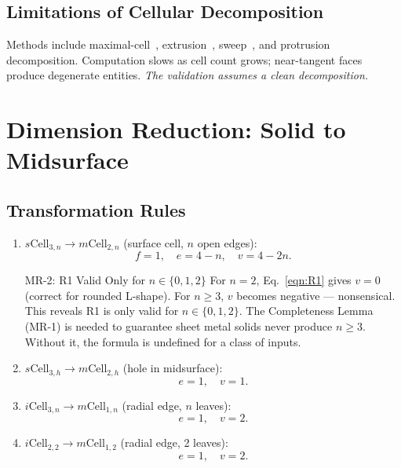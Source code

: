\documentclass[journal,twocolumn,10pt]{IEEEtran}
\newcommand{\sCell}[2]{s\text{Cell}_{#1,#2}}
\newcommand{\iCell}[2]{i\text{Cell}_{#1,#2}}
\newcommand{\mCell}[2]{m\text{Cell}_{#1,#2}}
\begin{document}
\subsection{Limitations of Cellular Decomposition}

Methods include maximal-cell~\cite{Woo2003}, extrusion~\cite{Boussuge2013a},
sweep~\cite{Wu2014}, and protrusion~\cite{Woo2014} decomposition. Computation
slows as cell count grows; near-tangent faces produce degenerate entities.
\emph{The validation assumes a clean decomposition.}

\section{Dimension Reduction: Solid to Midsurface}\label{sec:solidtomid}

\subsection{Transformation Rules}\label{sec:reduction_rules}

\begin{enumerate}[label=\textbf{R\arabic*.},noitemsep,topsep=2pt]

\item $\sCell{3}{n}\to\mCell{2}{n}$ (surface cell, $n$ open edges):
      \begin{equation}
        f=1,\quad e=4-n,\quad v=4-2n. \label{eqn:R1}
      \end{equation}

\begin{mrblock}{MR-2: R1 Valid Only for $n\in\{0,1,2\}$}
For $n=2$, Eq.~\eqref{eqn:R1} gives $v=0$ (correct for rounded L-shape).
For $n\geq3$, $v$ becomes negative --- nonsensical. This reveals R1 is
only valid for $n\in\{0,1,2\}$. The Completeness Lemma (MR-1) is needed to
guarantee sheet metal solids never produce $n\geq3$. Without it, the formula
is undefined for a class of inputs.
\end{mrblock}

\item $\sCell{3}{h}\to\mCell{2}{h}$ (hole in midsurface):
      \begin{equation}
        e=1,\quad v=1. \label{eqn:R2}
      \end{equation}

\item $\iCell{3}{n}\to\mCell{1}{n}$ (radial edge, $n$ leaves):
      \begin{equation}
        e=1,\quad v=2. \label{eqn:R3}
      \end{equation}

\item $\iCell{2}{2}\to\mCell{1}{2}$ (radial edge, 2 leaves):
      \begin{equation}
        e=1,\quad v=2. \label{eqn:R4}
      \end{equation}

\end{enumerate}
\end{document}
